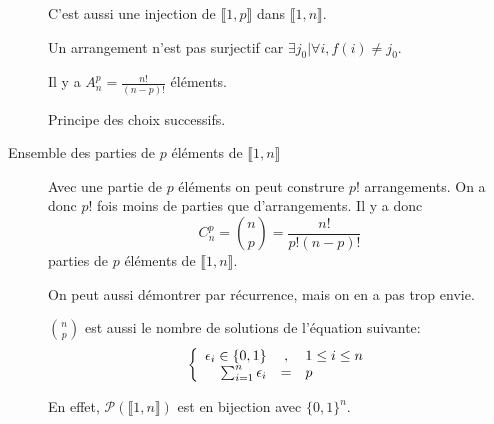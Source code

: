 \begin{description}
      C'est aussi une injection de $\llbracket 1,p\rrbracket$ dans $\llbracket 1,n\rrbracket$.

      \begin{remarque}
        Un arrangement n'est pas surjectif car $\exists j_0 | \forall i, f(i)\neq j_0$.
      \end{remarque}

      Il y a $A^p_n = \frac{n!}{(n-p)!}$ éléments.

      \begin{preuve}
        Principe des choix successifs.
      \end{preuve}

      \item[Ensemble des parties de $p$ éléments de $\llbracket 1,n\rrbracket$]
      Avec une partie de $p$ éléments on peut construre $p!$ arrangements.
      On a donc $p!$ fois moins de parties que d'arrangements. Il y a donc \[
        C^p_n = \binom{n}{p} = \frac{n!}{p!(n-p)!}
      \]
      parties de $p$ éléments de $\llbracket 1,n \rrbracket$.

      On peut aussi démontrer par récurrence, mais on en a pas trop envie.

      \begin{remarque}
        $\binom{n}{p}$ est aussi le nombre de solutions de l'équation suivante:
        \[\left\{
        \begin{array}{r c l}
          \epsilon_i \in\{0,1\}&,& 1\leq i \leq n\\
          \sum_{i=1}^n \epsilon_i &=& p
        \end{array}
        \right.
        \]

        En effet, $\mathcal{P}(\llbracket 1,n \rrbracket)$ est en bijection
        avec $\{0,1\}^n$.
       \end{remarque}
  \end{description}
